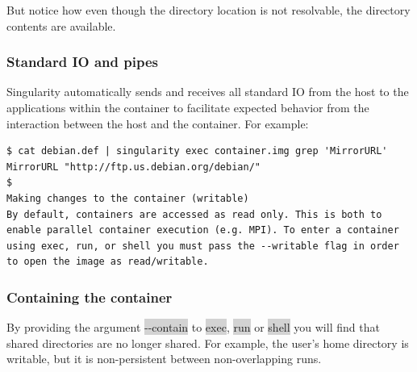\documentclass[a4paper]{article}
\begin{document}
But notice how even though the directory location is not resolvable, the directory contents are available.



\subsubsection{Standard IO and pipes}

Singularity automatically sends and receives all standard IO from the host to the applications within the container to facilitate expected behavior from the interaction between the host and the container. For example:
\begin{lstlisting}[frame=single]
$ cat debian.def | singularity exec container.img grep 'MirrorURL'
MirrorURL "http://ftp.us.debian.org/debian/"
$ 
Making changes to the container (writable)
By default, containers are accessed as read only. This is both to enable parallel container execution (e.g. MPI). To enter a container using exec, run, or shell you must pass the --writable flag in order to open the image as read/writable.

\end{lstlisting}

\subsubsection{Containing the container}

By providing the argument \colorbox{lightgray}{-{}-contain} to \colorbox{lightgray}{exec}, \colorbox{lightgray}{run} or \colorbox{lightgray}{shell} you will find that shared directories are no longer shared. For example, the user’s home directory is writable, but it is non-persistent between non-overlapping runs.
\end{document}

